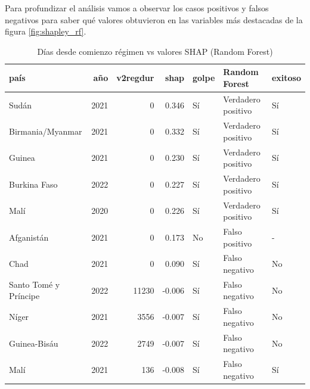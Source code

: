 \documentclass{article}
\begin{document}

Para profundizar el análisis vamos a observar los casos positivos y falsos negativos para
saber qué valores obtuvieron en las variables más destacadas de la figura \ref{fig:shapley_rf}.

\begin{table}[H]
  \centering

  \begin{tabular}{lrrrlll}
    \toprule
    país & año & v2regdur & shap & golpe & Random Forest & exitoso \\
    \midrule
    Sudán & 2021 & 0 & 0.346 & Sí & Verdadero positivo & Sí \\
    Birmania/Myanmar & 2021 & 0 & 0.332 & Sí & Verdadero positivo & Sí \\
    Guinea & 2021 & 0 & 0.230 & Sí & Verdadero positivo & Sí \\
    Burkina Faso & 2022 & 0 & 0.227 & Sí & Verdadero positivo & Sí \\
    Malí & 2020 & 0 & 0.226 & Sí & Verdadero positivo & Sí \\
    Afganistán & 2021 & 0 & 0.173 & No & Falso positivo & - \\
    Chad & 2021 & 0 & 0.090 & Sí & Falso negativo & No \\
    Santo Tomé y Príncipe & 2022 & 11230 & -0.006 & Sí & Falso negativo & No \\
    Níger & 2021 & 3556 & -0.007 & Sí & Falso negativo & No \\
    Guinea-Bisáu & 2022 & 2749 & -0.007 & Sí & Falso negativo & No \\
    Malí & 2021 & 136 & -0.008 & Sí & Falso negativo & Sí \\
    \bottomrule
    \end{tabular} 
  \caption{Días desde comienzo régimen vs valores SHAP (Random Forest) \label{tab:shap_rf_regdur}}
\end{table}
\end{document}
